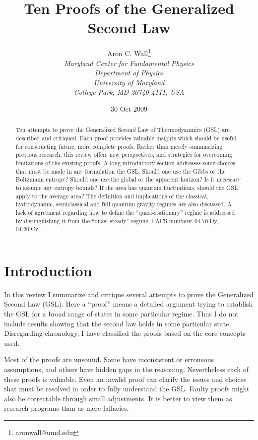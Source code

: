 \documentclass[12pt]{article}
\author{Aron C. Wall\footnote{aronwall@umd.edu}
\\ \textit{Maryland Center for Fundamental Physics} \\ \textit{Department of Physics} \\ \textit{University of Maryland} \\ \textit{College Park, MD 20740-4111, USA} }
\title{Ten Proofs of the Generalized Second Law}
\date{30 Oct 2009}
\begin{document}
\maketitle

\begin{abstract}
Ten attempts to prove the Generalized Second Law of Thermodyanmics (GSL) are described and critiqued.  Each proof provides valuable insights which should be useful for constructing future, more complete proofs.  Rather than merely summarizing previous research, this review offers new perspectives, and strategies for overcoming limitations of the existing proofs.  A long introductory section addresses some choices that must be made in any formulation the GSL: Should one use the Gibbs or the Boltzmann entropy?  Should one use the global or the apparent horizon?  Is it necessary to assume any entropy bounds?  If the area has quantum fluctuations, should the GSL apply to the average area?  The definition and implications of the classical, hydrodynamic, semiclassical and full quantum gravity regimes are also discussed.  A lack of agreement regarding how to define the ``quasi-stationary'' regime is addressed by distinguishing it from the ``quasi-steady'' regime.
\newline\newline
PACS numbers: 04.70.Dy, 04.20.Cv.
\end{abstract}

\newpage
\tableofcontents
\newpage

\section{Introduction}\label{intro}

In this review I summarize and critique several attempts to prove the Generalized Second Law (GSL).  Here a ``proof'' means a detailed argument trying to establish the GSL for a broad range of states in some particular regime.  Thus I do not include results showing that the second law holds in some particular state.  Disregarding chronology, I have classified the proofs based on the core concepts used.

Most of the proofs are unsound.  Some have inconsistent or erroneous assumptions, and others have hidden gaps in the reasoning.  Nevertheless each of these proofs is valuable.  Even an invalid proof can clarify the issues and choices that must be resolved in order to fully understand the GSL.  Faulty proofs might also be correctable through small adjustments.  It is better to view them as research programs than as mere fallacies.
\end{document}
